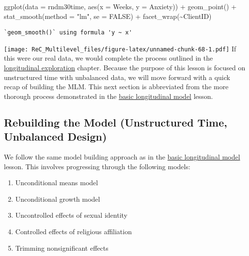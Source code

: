 \documentclass[
  english,
]{book}
\newenvironment{Shaded}{\begin{snugshade}}{\end{snugshade}}
\newcommand{\AttributeTok}[1]{\textcolor[rgb]{0.77,0.63,0.00}{#1}}
\newcommand{\ConstantTok}[1]{\textcolor[rgb]{0.00,0.00,0.00}{#1}}
\newcommand{\FunctionTok}[1]{\textcolor[rgb]{0.00,0.00,0.00}{#1}}
\newcommand{\NormalTok}[1]{#1}
\newcommand{\SpecialCharTok}[1]{\textcolor[rgb]{0.00,0.00,0.00}{#1}}
\newcommand{\StringTok}[1]{\textcolor[rgb]{0.31,0.60,0.02}{#1}}
\providecommand{\tightlist}{%
  \setlength{\itemsep}{0pt}\setlength{\parskip}{0pt}}
\begin{document}
\begin{Shaded}
\begin{Highlighting}[]
\FunctionTok{ggplot}\NormalTok{(}\AttributeTok{data =}\NormalTok{ rndm30time, }\FunctionTok{aes}\NormalTok{(}\AttributeTok{x =}\NormalTok{ Weeks, }\AttributeTok{y =}\NormalTok{ Anxiety)) }\SpecialCharTok{+} \FunctionTok{geom\_point}\NormalTok{() }\SpecialCharTok{+}
    \FunctionTok{stat\_smooth}\NormalTok{(}\AttributeTok{method =} \StringTok{"lm"}\NormalTok{, }\AttributeTok{se =} \ConstantTok{FALSE}\NormalTok{) }\SpecialCharTok{+} \FunctionTok{facet\_wrap}\NormalTok{(}\SpecialCharTok{\textasciitilde{}}\NormalTok{ClientID)}
\end{Highlighting}
\end{Shaded}

\begin{verbatim}
`geom_smooth()` using formula 'y ~ x'
\end{verbatim}

\texttt{[image: ReC\_Multilevel\_files/figure-latex/unnamed-chunk-68-1.pdf]}
If this were our real data, we would complete the process outlined in the \href{MLMexplore}{longitudinal exploration} chapter. Because the purpose of this lesson is focused on unstructured time with unbalanced data, we will move forward with a quick recap of building the MLM. This next section is abbreviated from the more thorough process demonstrated in the \href{LongMod}{basic longitudinal model} lesson.

\hypertarget{rebuilding-the-model-unstructured-time-unbalanced-design}{%
\subsection{Rebuilding the Model (Unstructured Time, Unbalanced Design)}\label{rebuilding-the-model-unstructured-time-unbalanced-design}}

We follow the same model building approach as in the \href{LongMod}{basic longitudinal model} lesson. This involves progressing through the following models:

\begin{enumerate}
\def\labelenumi{\arabic{enumi}.}
\tightlist
\item
  Unconditional means model
\item
  Unconditional growth model
\item
  Uncontrolled effects of sexual identity
\item
  Controlled effects of religious affiliation
\item
  Trimming nonsignificant effects
\end{enumerate}
\end{document}
